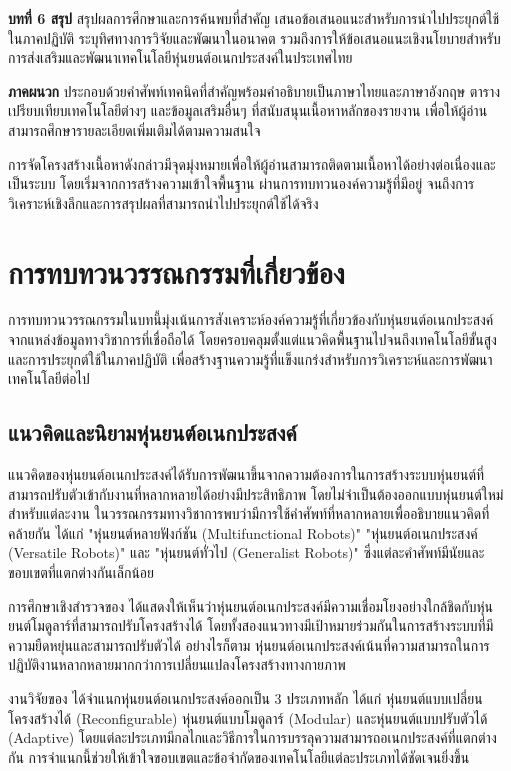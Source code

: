 \documentclass[a4paper]{article}
\begin{document}
\textbf{บทที่ 6 สรุป} สรุปผลการศึกษาและการค้นพบที่สำคัญ เสนอข้อเสนอแนะสำหรับการนำไปประยุกต์ใช้ในภาคปฏิบัติ ระบุทิศทางการวิจัยและพัฒนาในอนาคต รวมถึงการให้ข้อเสนอแนะเชิงนโยบายสำหรับการส่งเสริมและพัฒนาเทคโนโลยีหุ่นยนต์อเนกประสงค์ในประเทศไทย

\textbf{ภาคผนวก} ประกอบด้วยคำศัพท์เทคนิคที่สำคัญพร้อมคำอธิบายเป็นภาษาไทยและภาษาอังกฤษ ตารางเปรียบเทียบเทคโนโลยีต่างๆ และข้อมูลเสริมอื่นๆ ที่สนับสนุนเนื้อหาหลักของรายงาน เพื่อให้ผู้อ่านสามารถศึกษารายละเอียดเพิ่มเติมได้ตามความสนใจ

การจัดโครงสร้างเนื้อหาดังกล่าวมีจุดมุ่งหมายเพื่อให้ผู้อ่านสามารถติดตามเนื้อหาได้อย่างต่อเนื่องและเป็นระบบ โดยเริ่มจากการสร้างความเข้าใจพื้นฐาน ผ่านการทบทวนองค์ความรู้ที่มีอยู่ จนถึงการวิเคราะห์เชิงลึกและการสรุปผลที่สามารถนำไปประยุกต์ใช้ได้จริง

\section{การทบทวนวรรณกรรมที่เกี่ยวข้อง}
การทบทวนวรรณกรรมในบทนี้มุ่งเน้นการสังเคราะห์องค์ความรู้ที่เกี่ยวข้องกับหุ่นยนต์อเนกประสงค์จากแหล่งข้อมูลทางวิชาการที่เชื่อถือได้ โดยครอบคลุมตั้งแต่แนวคิดพื้นฐานไปจนถึงเทคโนโลยีขั้นสูงและการประยุกต์ใช้ในภาคปฏิบัติ เพื่อสร้างฐานความรู้ที่แข็งแกร่งสำหรับการวิเคราะห์และการพัฒนาเทคโนโลยีต่อไป

\subsection{แนวคิดและนิยามหุ่นยนต์อเนกประสงค์}

แนวคิดของหุ่นยนต์อเนกประสงค์ได้รับการพัฒนาขึ้นจากความต้องการในการสร้างระบบหุ่นยนต์ที่สามารถปรับตัวเข้ากับงานที่หลากหลายได้อย่างมีประสิทธิภาพ โดยไม่จำเป็นต้องออกแบบหุ่นยนต์ใหม่สำหรับแต่ละงาน \parencite{liang2025decoding} ในวรรณกรรมทางวิชาการพบว่ามีการใช้คำศัพท์ที่หลากหลายเพื่ออธิบายแนวคิดที่คล้ายกัน ได้แก่ "หุ่นยนต์หลายฟังก์ชัน (Multifunctional Robots)" "หุ่นยนต์อเนกประสงค์ (Versatile Robots)" และ "หุ่นยนต์ทั่วไป (Generalist Robots)" ซึ่งแต่ละคำศัพท์มีนัยและขอบเขตที่แตกต่างกันเล็กน้อย

การศึกษาเชิงสำรวจของ \textcite{bi2016survey} ได้แสดงให้เห็นว่าหุ่นยนต์อเนกประสงค์มีความเชื่อมโยงอย่างใกล้ชิดกับหุ่นยนต์โมดูลาร์ที่สามารถปรับโครงสร้างได้ โดยทั้งสองแนวทางมีเป้าหมายร่วมกันในการสร้างระบบที่มีความยืดหยุ่นและสามารถปรับตัวได้ อย่างไรก็ตาม หุ่นยนต์อเนกประสงค์เน้นที่ความสามารถในการปฏิบัติงานหลากหลายมากกว่าการเปลี่ยนแปลงโครงสร้างทางกายภาพ

งานวิจัยของ \textcite{hameed2017modular} ได้จำแนกหุ่นยนต์อเนกประสงค์ออกเป็น 3 ประเภทหลัก ได้แก่ หุ่นยนต์แบบเปลี่ยนโครงสร้างได้ (Reconfigurable) หุ่นยนต์แบบโมดูลาร์ (Modular) และหุ่นยนต์แบบปรับตัวได้ (Adaptive) โดยแต่ละประเภทมีกลไกและวิธีการในการบรรลุความสามารถอเนกประสงค์ที่แตกต่างกัน การจำแนกนี้ช่วยให้เข้าใจขอบเขตและข้อจำกัดของเทคโนโลยีแต่ละประเภทได้ชัดเจนยิ่งขึ้น
\end{document}
